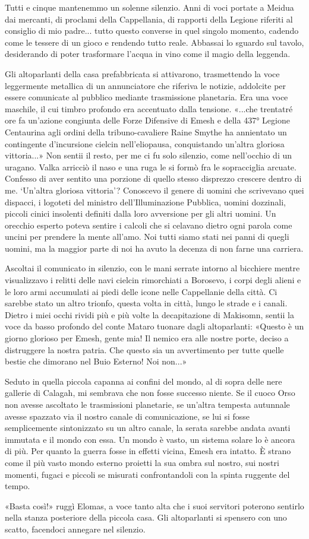 Tutti e cinque mantenemmo un solenne silenzio. Anni di voci portate a
Meidua dai mercanti, di proclami della Cappellania, di rapporti della
Legione riferiti al consiglio di mio padre... tutto questo converse in
quel singolo momento, cadendo come le tessere di un gioco e rendendo
tutto reale. Abbassai lo sguardo sul tavolo, desiderando di poter
trasformare l'acqua in vino come il magio della leggenda.

Gli altoparlanti della casa prefabbricata si attivarono, trasmettendo la
voce leggermente metallica di un annunciatore che riferiva le notizie,
addolcite per essere comunicate al pubblico mediante trasmissione
planetaria. Era una voce maschile, il cui timbro profondo era accentuato
dalla tensione. «...che trentatré ore fa un'azione congiunta delle Forze
Difensive di Emesh e della 437° Legione Centaurina agli ordini della
tribuno-cavaliere Raine Smythe ha annientato un contingente d'incursione
cielcin nell'eliopausa, conquistando un'altra gloriosa vittoria...» Non
sentii il resto, per me ci fu solo silenzio, come nell'occhio di un
uragano. Valka arricciò il naso e una ruga le si formò fra le
sopracciglia arcuate. Confesso di aver sentito una porzione di quello
stesso disprezzo crescere dentro di me. `Un'altra gloriosa vittoria'?
Conoscevo il {genere} di uomini che scrivevano quei dispacci, i logoteti
del ministro dell'Illuminazione Pubblica, uomini dozzinali, piccoli
cinici insolenti definiti dalla loro avversione per gli altri uomini. Un
orecchio esperto poteva sentire i calcoli che si celavano dietro ogni
parola come uncini per prendere la mente all'amo. Noi tutti siamo stati
nei panni di quegli uomini, ma la maggior parte di noi ha avuto la
decenza di non farne una carriera.

Ascoltai il comunicato in silenzio, con le mani serrate intorno al
bicchiere mentre visualizzavo i relitti delle navi cielcin rimorchiati a
Borosevo, i corpi degli alieni e le loro armi accumulati ai piedi delle
icone nelle Cappellanie della città. Ci sarebbe stato un altro trionfo,
questa volta in città, lungo le strade e i canali. Dietro i miei occhi
rividi più e più volte la decapitazione di Makisomn, sentii la voce da
basso profondo del conte Mataro tuonare dagli altoparlanti: «Questo è un
giorno glorioso per Emesh, gente mia! Il nemico era alle nostre porte,
deciso a distruggere la nostra patria. Che questo sia un avvertimento
per tutte quelle bestie che dimorano nel Buio Esterno! Noi non...»

Seduto in quella piccola capanna ai confini del mondo, al di sopra delle
nere gallerie di Calagah, mi sembrava che non fosse successo niente. Se
il cuoco Orso non avesse ascoltato le trasmissioni planetarie, se
un'altra tempesta autunnale avesse spazzato via il nostro canale di
comunicazione, se lui si fosse semplicemente sintonizzato su un altro
canale, la serata sarebbe andata avanti immutata e il mondo con essa. Un
mondo è vasto, un sistema solare lo è ancora di più. Per quanto la
guerra fosse in effetti vicina, Emesh era intatto. È strano come il più
vasto mondo esterno proietti la sua ombra sul nostro, sui nostri
momenti, fugaci e piccoli se misurati confrontandoli con la spinta
ruggente del tempo.

«Basta così!» ruggì Elomas, a voce tanto alta che i suoi servitori
poterono sentirlo nella stanza posteriore della piccola casa. Gli
altoparlanti si spensero con uno scatto, facendoci annegare nel
silenzio.

